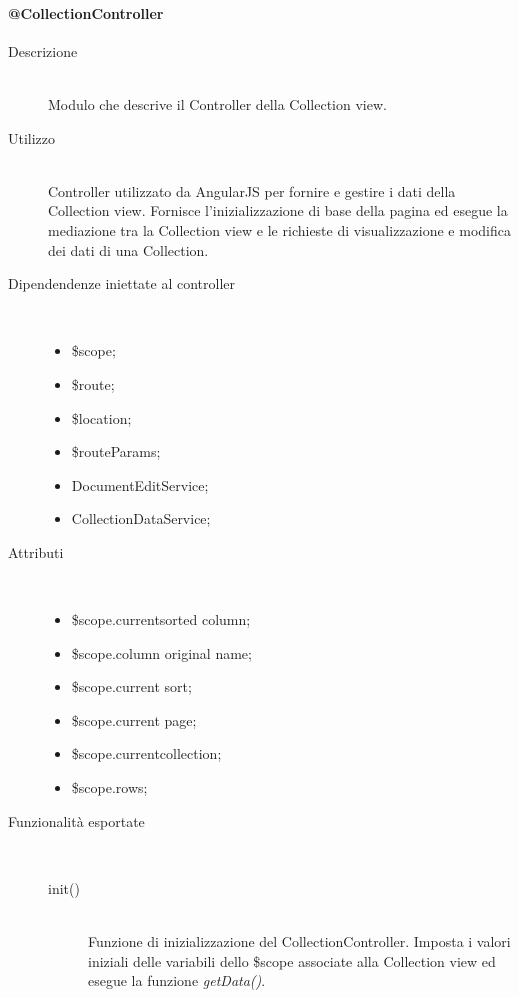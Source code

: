 \paragraph{@CollectionController}
\begin{description}
 \item[Descrizione] \hfill \\
 Modulo che descrive il Controller della Collection view.
 
 \item[Utilizzo] \hfill \\
 Controller utilizzato da AngularJS per fornire e gestire i dati della Collection view.
 Fornisce l'inizializzazione di base della pagina ed esegue la mediazione tra la Collection view
 e le richieste di visualizzazione e modifica dei dati di una Collection.
 
 \item[Dipendendenze iniettate al controller] \hfill \\
 \begin{itemize}
  \item \$scope;
  \item \$route;
  \item \$location;
  \item \$routeParams;
  \item DocumentEditService;
  \item CollectionDataService;
 \end{itemize}
 
 \item[Attributi] \hfill \\
 \begin{itemize}
 \item \$scope.current\textunderscore sorted \textunderscore column;
 \item \$scope.column \textunderscore original \textunderscore name;
 \item \$scope.current \textunderscore sort;
 \item \$scope.current \textunderscore page;
 \item \$scope.current\textunderscore collection;
 \item \$scope.rows;
 \end{itemize}
 
 \item[Funzionalità esportate] \hfill \\
 \begin{description}
  \item[init()] \hfill \\
  Funzione di inizializzazione del CollectionController. Imposta i valori iniziali delle variabili dello
  \$scope associate alla Collection view ed esegue la funzione \emph{getData()}.
  

\end{description}
\end{description}
